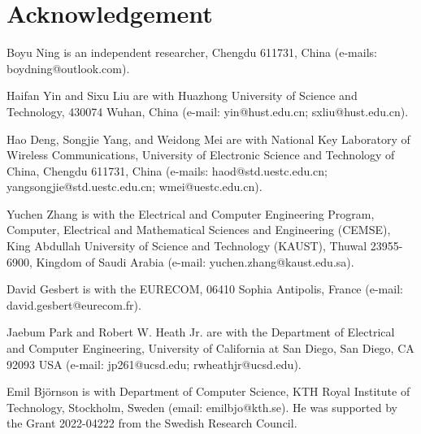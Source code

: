 \documentclass[lettersize,journal]{IEEEtran}
\begin{document}
\section*{Acknowledgement}
\small Boyu Ning is an independent researcher, Chengdu 611731, China (e-mails: boydning@outlook.com).

Haifan Yin and Sixu Liu are with Huazhong University of Science and Technology, 430074 Wuhan, China (e-mail: yin@hust.edu.cn; sxliu@hust.edu.cn).

Hao Deng, Songjie Yang, and Weidong Mei are with National Key Laboratory of Wireless Communications, University of Electronic Science and Technology of China, Chengdu 611731, China (e-mails: haod@std.uestc.edu.cn; yangsongjie@std.uestc.edu.cn; wmei@uestc.edu.cn).

Yuchen Zhang is with the Electrical and Computer Engineering Program, Computer, Electrical and Mathematical Sciences and Engineering (CEMSE), King Abdullah University of Science and Technology (KAUST), Thuwal 23955-6900, Kingdom of Saudi Arabia (e-mail: yuchen.zhang@kaust.edu.sa).

David Gesbert is with the EURECOM, 06410 Sophia Antipolis, France (e-mail: david.gesbert@eurecom.fr).

Jaebum Park and Robert W. Heath Jr. are with the Department of Electrical and Computer Engineering, University of California at San Diego, San Diego, CA 92093 USA (e-mail: jp261@ucsd.edu; rwheathjr@ucsd.edu).

Emil Bj{\"o}rnson is with Department of Computer Science, KTH Royal Institute of Technology, Stockholm, Sweden (email: emilbjo@kth.se). He was supported by the Grant 2022-04222 from the Swedish Research Council.




\end{document}
